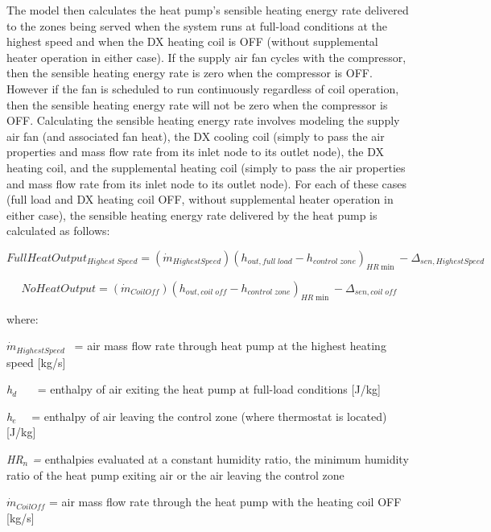 The model then calculates the heat pump's sensible heating energy rate delivered to the zones being served when the system runs at full-load conditions at the highest speed and when the DX heating coil is OFF (without supplemental heater operation in either case). If the supply air fan cycles with the compressor, then the sensible heating energy rate is zero when the compressor is OFF. However if the fan is scheduled to run continuously regardless of coil operation, then the sensible heating energy rate will not be zero when the compressor is OFF. Calculating the sensible heating energy rate involves modeling the supply air fan (and associated fan heat), the DX cooling coil (simply to pass the air properties and mass flow rate from its inlet node to its outlet node), the DX heating coil, and the supplemental heating coil (simply to pass the air properties and mass flow rate from its inlet node to its outlet node). For each of these cases (full load and DX heating coil OFF, without supplemental heater operation in either case), the sensible heating energy rate delivered by the heat pump is calculated as follows:

\begin{equation}
FullHeatOutpu{t_{Highest\;Speed}} = \left( {{{\dot m}_{HighestSpeed}}} \right){\left( {{h_{out,full\;load}} - {h_{control\;zone}}} \right)_{HR\min }} - {\Delta_{sen,HighestSpeed}}
\end{equation}

\begin{equation}
NoHeatOutput = \left( {{{\dot m}_{CoilOff}}} \right){\left( {{h_{out,coil\;off}} - {h_{control\;zone}}} \right)_{HR\min }} - {\Delta_{sen,coil\;off}}
\end{equation}

where:

\emph{\({\dot m}_{HighestSpeed}\)}~ = air mass flow rate through heat pump at the highest heating speed {[}kg/s{]}

\emph{h\(_{d}\)}~~~ = enthalpy of air exiting the heat pump at full-load conditions {[}J/kg{]}

\emph{h\(_{e}\)}~~ = enthalpy of air leaving the control zone (where thermostat is located) {[}J/kg{]}

\emph{HR\(_{n}\) =} enthalpies evaluated at a constant humidity ratio, the minimum humidity ratio of the heat pump exiting air or the air leaving the control zone

\({\dot m}_{CoilOff}\) = air mass flow rate through the heat pump with the heating coil OFF {[}kg/s{]}

